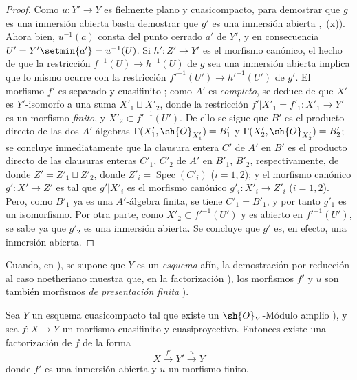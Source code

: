 \begin{proof}
Como $u:Y'\to Y$ es fielmente plano y cuasicompacto, para demostrar que $g$ es una inmersión abierta basta demostrar que $g'$ es una inmersión abierta ,~(x)).
Ahora bien, $u^{-1}(a)$ consta del punto cerrado $a'$ de $Y'$, y en consecuencia $U'=Y'\setmin\{a'\}=u^{-1}(U)$.
Si $h':Z'\to Y'$ es el morfismo canónico, el hecho de que la restricción $f^{-1}(U)\to h^{-1}(U)$ de $g$ sea una inmersión abierta implica que lo mismo ocurre con la restricción $f'^{-1}(U')\to h'^{-1}(U')$ de $g'$.
El morfismo $f'$ es separado y cuasifinito ; como $A'$ es \emph{completo}, se deduce de  que $X'$ es $Y'$-isomorfo a una suma $X'_1\sqcup X'_2$, donde la restricción $f'|X'_1=f'_1:X'_1\to Y'$ es un morfismo \emph{finito}, y $X'_2\subset f'^{-1}(U')$.
De ello se sigue que $B'$ es el producto directo de las dos $A'$-álgebras $\Gamma(X'_1,\sh{O}_{X'_1})=B'_1$ y $\Gamma(X'_2,\sh{O}_{X'_2})=B'_2$; se concluye inmediatamente que la clausura entera $C'$ de $A'$ en $B'$ es el producto directo de las clausuras enteras $C'_1$, $C'_2$ de $A'$ en $B'_1$, $B'_2$, respectivamente, de donde $Z'=Z'_1\sqcup Z'_2$, donde $Z'_i=\operatorname{Spec}(C'_i)$ ($i=1,2$); y el morfismo canónico $g':X'\to Z'$ es tal que $g'|X'_i$ es el morfismo canónico $g'_i:X'_i\to Z'_i$ ($i=1,2$).
Pero, como $B'_1$ ya es una $A'$-álgebra finita, se tiene $C'_1=B'_1$, y por tanto $g'_1$ es un isomorfismo.
Por otra parte, como $X'_2\subset f'^{-1}(U')$ y es abierto en $f'^{-1}(U')$, se
sabe ya que $g'_2$ es una inmersión abierta.
Se concluye que $g'$ es, en efecto, una inmersión abierta.
\end{proof}

\begin{remark}[8.12.7]
\label{IV.8.12.7}
Cuando, en ), se supone que $Y$ es un \emph{esquema} afín, la demostración por reducción al caso noetheriano muestra que, en la factorización ), los morfismos $f'$ y $u$ son también morfismos \emph{de presentación finita} ).
\end{remark}

\begin{corollary}[8.12.8]
\label{IV.8.12.8}
Sea $Y$ un esquema cuasicompacto tal que existe un $\sh{O}_Y$-Módulo amplio ), y sea $f:X\to Y$ un morfismo cuasifinito y cuasiproyectivo.
Entonces existe una factorización de $f$ de la forma
\[
X\xrightarrow{f'}Y'\xrightarrow{u}Y
\]
donde $f'$ es una inmersión abierta y $u$ un morfismo finito.
\end{corollary}

